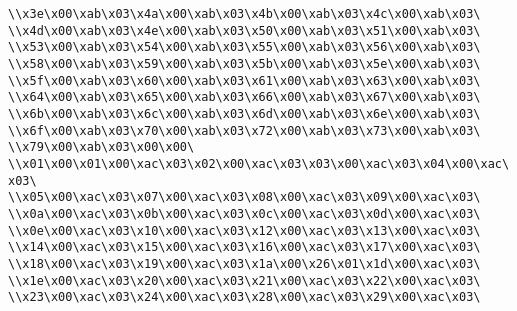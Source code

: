 \verb|\\x3e\x00\xab\x03\x4a\x00\xab\x03\x4b\x00\xab\x03\x4c\x00\xab\x03\|\newline
\verb|\\x4d\x00\xab\x03\x4e\x00\xab\x03\x50\x00\xab\x03\x51\x00\xab\x03\|\newline
\verb|\\x53\x00\xab\x03\x54\x00\xab\x03\x55\x00\xab\x03\x56\x00\xab\x03\|\newline
\verb|\\x58\x00\xab\x03\x59\x00\xab\x03\x5b\x00\xab\x03\x5e\x00\xab\x03\|\newline
\verb|\\x5f\x00\xab\x03\x60\x00\xab\x03\x61\x00\xab\x03\x63\x00\xab\x03\|\newline
\verb|\\x64\x00\xab\x03\x65\x00\xab\x03\x66\x00\xab\x03\x67\x00\xab\x03\|\newline
\verb|\\x6b\x00\xab\x03\x6c\x00\xab\x03\x6d\x00\xab\x03\x6e\x00\xab\x03\|\newline
\verb|\\x6f\x00\xab\x03\x70\x00\xab\x03\x72\x00\xab\x03\x73\x00\xab\x03\|\newline
\verb|\\x79\x00\xab\x03\x00\x00\|\newline
\verb|\\x01\x00\x01\x00\xac\x03\x02\x00\xac\x03\x03\x00\xac\x03\x04\x00\xac\x03\|\newline
\verb|\\x05\x00\xac\x03\x07\x00\xac\x03\x08\x00\xac\x03\x09\x00\xac\x03\|\newline
\verb|\\x0a\x00\xac\x03\x0b\x00\xac\x03\x0c\x00\xac\x03\x0d\x00\xac\x03\|\newline
\verb|\\x0e\x00\xac\x03\x10\x00\xac\x03\x12\x00\xac\x03\x13\x00\xac\x03\|\newline
\verb|\\x14\x00\xac\x03\x15\x00\xac\x03\x16\x00\xac\x03\x17\x00\xac\x03\|\newline
\verb|\\x18\x00\xac\x03\x19\x00\xac\x03\x1a\x00\x26\x01\x1d\x00\xac\x03\|\newline
\verb|\\x1e\x00\xac\x03\x20\x00\xac\x03\x21\x00\xac\x03\x22\x00\xac\x03\|\newline
\verb|\\x23\x00\xac\x03\x24\x00\xac\x03\x28\x00\xac\x03\x29\x00\xac\x03\|\newline
